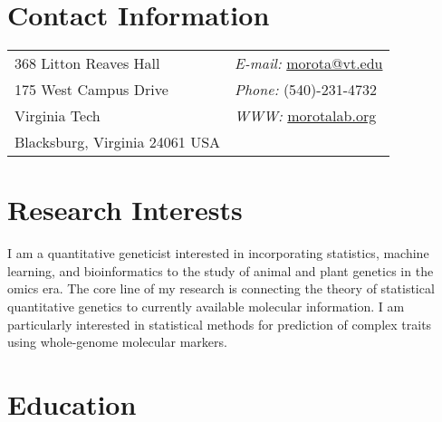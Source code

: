 \documentclass[margin,line,10pt]{res}
\begin{document}

\begin{resume}
\section{\sc Contact Information}
\vspace{.05in}
\begin{tabular}{@{}p{2in}p{4in}}
368 Litton Reaves Hall  & \hspace{2.5cm} {\it E-mail:}  \href{mailto:morota@vt.edu}{morota@vt.edu} \\       
 175 West Campus Drive  & \hspace{2.5cm} {\it Phone:} (540)-231-4732\\     
Virginia Tech  & \hspace{2.5cm} {\it WWW:} \textcolor{blue}{\href{http://morotalab.org/}{morotalab.org}  }\\
Blacksburg, Virginia 24061 USA  & \\
\end{tabular}


\vspace{0.4cm}
\section{\sc Research Interests}
I am a quantitative geneticist interested in incorporating statistics, machine learning, and bioinformatics to the study of animal and plant genetics in the omics era. The core line of my research is connecting the theory of statistical quantitative genetics to currently available molecular information. 
I am particularly interested in statistical methods for prediction of complex traits using whole-genome molecular markers. 


\vspace{0.4cm}
\section{\sc Education}


\end{resume}
\end{document}
